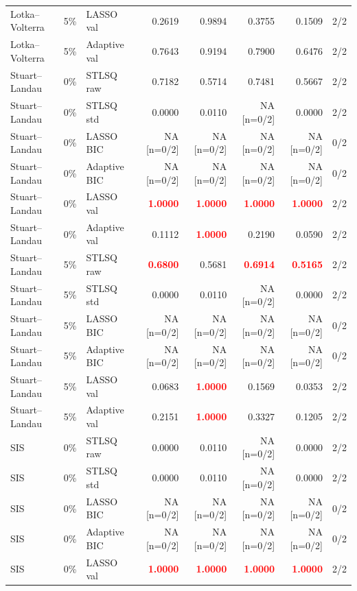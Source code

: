 \documentclass{article}
\begin{document}
\begin{longtable}{lllrrrrr}
Lotka--Volterra & 5\% & LASSO val & 0.2619 & 0.9894 & 0.3755 & 0.1509 & 2/2 \\
Lotka--Volterra & 5\% & Adaptive val & 0.7643 & 0.9194 & 0.7900 & 0.6476 & 2/2 \\
\midrule
Stuart--Landau & 0\% & STLSQ raw & 0.7182 & 0.5714 & 0.7481 & 0.5667 & 2/2 \\
Stuart--Landau & 0\% & STLSQ std & 0.0000 & 0.0110 & NA [n=0/2] & 0.0000 & 2/2 \\
Stuart--Landau & 0\% & LASSO BIC & NA [n=0/2] & NA [n=0/2] & NA [n=0/2] & NA [n=0/2] & 0/2 \\
Stuart--Landau & 0\% & Adaptive BIC & NA [n=0/2] & NA [n=0/2] & NA [n=0/2] & NA [n=0/2] & 0/2 \\
Stuart--Landau & 0\% & LASSO val & \textcolor{red}{\textbf{1.0000}} & \textcolor{red}{\textbf{1.0000}} & \textcolor{red}{\textbf{1.0000}} & \textcolor{red}{\textbf{1.0000}} & 2/2 \\
Stuart--Landau & 0\% & Adaptive val & 0.1112 & \textcolor{red}{\textbf{1.0000}} & 0.2190 & 0.0590 & 2/2 \\
\midrule
Stuart--Landau & 5\% & STLSQ raw & \textcolor{red}{\textbf{0.6800}} & 0.5681 & \textcolor{red}{\textbf{0.6914}} & \textcolor{red}{\textbf{0.5165}} & 2/2 \\
Stuart--Landau & 5\% & STLSQ std & 0.0000 & 0.0110 & NA [n=0/2] & 0.0000 & 2/2 \\
Stuart--Landau & 5\% & LASSO BIC & NA [n=0/2] & NA [n=0/2] & NA [n=0/2] & NA [n=0/2] & 0/2 \\
Stuart--Landau & 5\% & Adaptive BIC & NA [n=0/2] & NA [n=0/2] & NA [n=0/2] & NA [n=0/2] & 0/2 \\
Stuart--Landau & 5\% & LASSO val & 0.0683 & \textcolor{red}{\textbf{1.0000}} & 0.1569 & 0.0353 & 2/2 \\
Stuart--Landau & 5\% & Adaptive val & 0.2151 & \textcolor{red}{\textbf{1.0000}} & 0.3327 & 0.1205 & 2/2 \\
\midrule
SIS & 0\% & STLSQ raw & 0.0000 & 0.0110 & NA [n=0/2] & 0.0000 & 2/2 \\
SIS & 0\% & STLSQ std & 0.0000 & 0.0110 & NA [n=0/2] & 0.0000 & 2/2 \\
SIS & 0\% & LASSO BIC & NA [n=0/2] & NA [n=0/2] & NA [n=0/2] & NA [n=0/2] & 0/2 \\
SIS & 0\% & Adaptive BIC & NA [n=0/2] & NA [n=0/2] & NA [n=0/2] & NA [n=0/2] & 0/2 \\
SIS & 0\% & LASSO val & \textcolor{red}{\textbf{1.0000}} & \textcolor{red}{\textbf{1.0000}} & \textcolor{red}{\textbf{1.0000}} & \textcolor{red}{\textbf{1.0000}} & 2/2 \\

\end{longtable}
\end{document}
